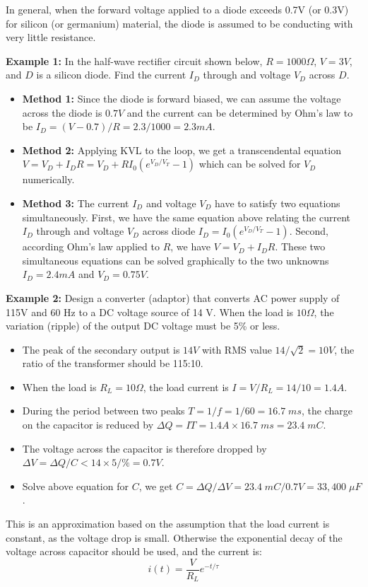 In general, when the forward voltage applied to a diode exceeds 0.7V (or 
0.3V) for silicon (or germanium) material, the diode is assumed to be 
conducting with very little resistance.

{\bf Example 1: } In the half-wave rectifier circuit shown below, 
$R=1000\Omega$, $V=3V$, and $D$ is a silicon diode. Find the current
$I_D$ through and voltage $V_D$ across $D$.


\begin{itemize}
\item {\bf Method 1: } Since the diode is forward biased, we can assume 
the voltage across the diode is $0.7V$ and the current can be determined 
by Ohm's law to be $I_D=(V-0.7)/R=2.3/1000=2.3mA$.

\item {\bf Method 2: } Applying KVL to the loop, we get a transcendental 
equation $V=V_D+I_DR=V_D+RI_0(e^{V_D/V_T}-1)$ which can be solved for
$V_D$ numerically. 

\item {\bf Method 3: } The current $I_D$ and voltage $V_D$ have to satisfy 
two equations simultaneously. First, we have the same equation above 
relating the current $I_D$ through and voltage $V_D$ across diode
$I_D=I_0(e^{V_D/V_T}-1)$. Second, according Ohm's law applied to $R$, we
have $V=V_D+I_DR$. These two simultaneous equations can be solved 
graphically to the two unknowns $I_D=2.4mA$ and $V_D=0.75V$.
\end{itemize}

{\bf Example 2: } Design a converter (adaptor) that converts AC power 
supply of 115V and 60 Hz to a DC voltage source of 14 V. When the load is
$10\Omega$, the variation (ripple) of the output DC voltage must be 5\% or
less.



\begin{itemize}
\item The peak of the secondary output is $14V$ with RMS value
$14/\sqrt{2}=10V$, the ratio of the transformer should be 115:10. 
\item When the load is $R_L=10\Omega$, the load current is $I=V/R_L=14/10=1.4A$.
\item During the period between two peaks $T=1/f=1/60=16.7\;ms$, the charge 
	on the capacitor is reduced by $\Delta Q=IT=1.4A\times 16.7\;ms
	=23.4\;mC$. 	
\item The voltage across the capacitor is therefore dropped by
	$\Delta V=\Delta Q/C < 14\times 5/\%=0.7V $. 
\item Solve above equation for $C$, we get $C=\Delta Q/\Delta V=23.4\;mC/0.7V
	=33,400\;\mu F$.
\end{itemize}
This is an approximation based on the assumption that the load current is
constant, as the voltage drop is small. Otherwise the exponential decay of
the voltage across capacitor should be used, and the current is:
\[	i(t)=\frac{V}{R_L} e^{-t/\tau}	\]

